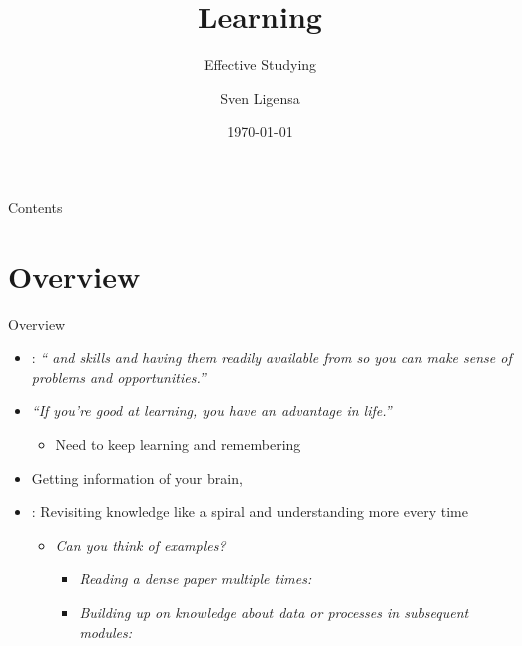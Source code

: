 \documentclass{ercisbeamer}
\title{Learning}
\subtitle{Effective Studying}
\author{Sven Ligensa}
\institute{European Research Center for Information Systems (ERCIS)}
\date{\today}
\begin{document}
\begin{frame}
    \begin{tbox}
        \titlepage
    \end{tbox}
\end{frame}
\setbgimage{}

\begin{frame}{Contents}
    \tableofcontents
\end{frame}

\section{Overview}
\begin{frame}{Overview}
    \begin{tbox}
        \begin{itemize}
            \item {}: \emph{`` and skills and having them readily available from  so you can make sense of  problems and opportunities.'' }
            \item \emph{``If you're good at learning, you have an advantage in life.'' }
            \begin{itemize}
                \item Need to keep learning and remembering 
            \end{itemize}
            \item Getting information  of your brain,  \cite{agarwal19}
            \item {}: Revisiting knowledge like a spiral and understanding more every time
            \begin{itemize}
                \item \emph{Can you think of examples?} \pause
                \begin{itemize}
                    \item \emph{Reading a dense paper multiple times: }
                    \item \emph{Building up on knowledge about \emph{data} or \emph{processes} in subsequent modules: }

\end{itemize}
\end{itemize}
\end{itemize}
\end{tbox}
\end{frame}
\end{document}
